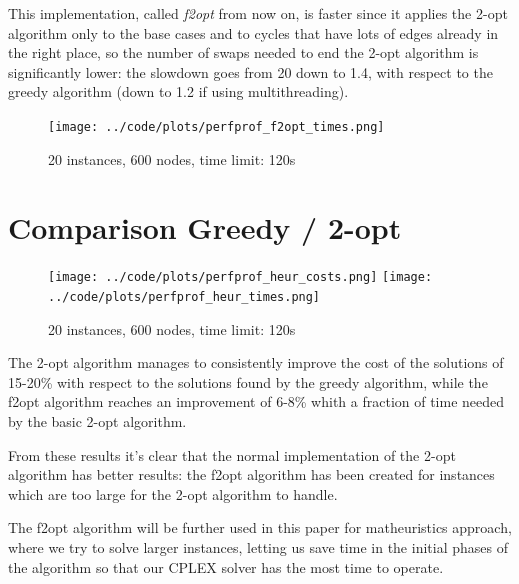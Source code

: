This implementation, called \textit{f2opt} from now on, is faster since it applies the 2-opt algorithm only to the base cases and to cycles that have lots of edges already in the right place, so the number of swaps needed to end the 2-opt algorithm is significantly lower: the slowdown goes from 20 down to 1.4, with respect to the greedy algorithm (down to 1.2 if using multithreading).

\begin{figure}[h]
    \centering
    \texttt{[image: ../code/plots/perfprof\_f2opt\_times.png]}
    \caption*{20 instances, 600 nodes, time limit: 120s}
\end{figure}

\newpage 

\section{Comparison Greedy / 2-opt}

\begin{figure}[h]
    \centering
    \texttt{[image: ../code/plots/perfprof\_heur\_costs.png]}
    \texttt{[image: ../code/plots/perfprof\_heur\_times.png]}
    \caption*{20 instances, 600 nodes, time limit: 120s}
\end{figure}

The 2-opt algorithm manages to consistently improve the cost of the solutions of 15-20\% with respect to the solutions found by the greedy algorithm, while the f2opt algorithm reaches an improvement of 6-8\% whith a fraction of time needed by the basic 2-opt algorithm.

From these results it's clear that the normal implementation of the 2-opt algorithm has better results: the f2opt algorithm has been created for instances which are too large for the 2-opt algorithm to handle.

The f2opt algorithm will be further used in this paper for matheuristics approach, where we try to solve larger instances, letting us save time in the initial phases of the algorithm so that our CPLEX solver has the most time to operate.

